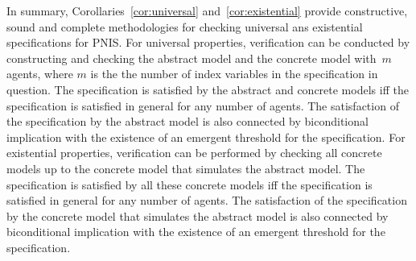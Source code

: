 In summary, Corollaries~\ref{cor:universal} and~\ref{cor:existential} provide
constructive, sound and complete methodologies for checking universal ans
existential specifications for PNIS.  For universal properties, verification can
be conducted by constructing and checking the abstract model and the concrete
model with~$m$ agents, where $m$ is the the number of index variables in the
specification in question. The specification is satisfied by the abstract and
concrete models iff the specification is satisfied in general for any number of
agents.  The satisfaction of the specification by the abstract model is also
connected by biconditional implication with the existence of an emergent
threshold for the specification. For existential properties, verification can be
performed by checking all concrete models up to the concrete model that
simulates the abstract model. The specification is satisfied by all these
concrete models iff the specification is satisfied in general for any number of
agents.   The satisfaction of the specification by the concrete model that
simulates the abstract model is also connected by biconditional implication with
the existence of an emergent threshold for the specification. 








